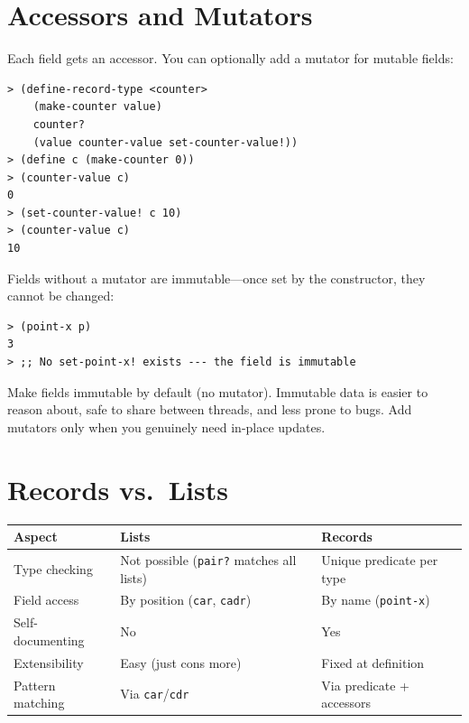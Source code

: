 \section{Accessors and Mutators}

Each field gets an accessor. You can optionally add a mutator for mutable fields:

\begin{lstlisting}[style=repl]
> (define-record-type <counter>
    (make-counter value)
    counter?
    (value counter-value set-counter-value!))
> (define c (make-counter 0))
> (counter-value c)
0
> (set-counter-value! c 10)
> (counter-value c)
10
\end{lstlisting}

Fields without a mutator are immutable---once set by the constructor, they cannot be changed:

\begin{lstlisting}[style=repl]
> (point-x p)
3
> ;; No set-point-x! exists --- the field is immutable
\end{lstlisting}

\begin{note}
Make fields immutable by default (no mutator). Immutable data is easier to reason about, safe to share between threads, and less prone to bugs. Add mutators only when you genuinely need in-place updates.
\end{note}

\section{Records vs.\ Lists}

\begin{center}
\begin{tabular}{lp{4.5cm}p{4.5cm}}
\textbf{Aspect} & \textbf{Lists} & \textbf{Records} \\
\hline
Type checking & Not possible (\texttt{pair?} matches all lists) & Unique predicate per type \\
Field access & By position (\texttt{car}, \texttt{cadr}) & By name (\texttt{point-x}) \\
Self-documenting & No & Yes \\
Extensibility & Easy (just cons more) & Fixed at definition \\
Pattern matching & Via \texttt{car}/\texttt{cdr} & Via predicate + accessors \\
\end{tabular}
\end{center}


